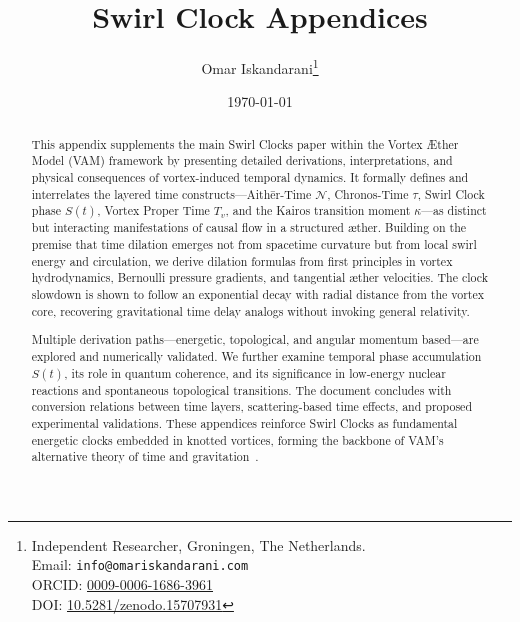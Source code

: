 \documentclass[a4paper,12pt]{article}
\title{Swirl Clock Appendices\\[0.5em]}
\author{
    Omar Iskandarani\thanks{
        Independent Researcher, Groningen, The Netherlands.\\
        Email: \texttt{info@omariskandarani.com}\\
        ORCID: \href{https://orcid.org/0009-0006-1686-3961}{0009-0006-1686-3961}\\
        DOI: \href{https://doi.org/10.5281/zenodo.15707931}{10.5281/zenodo.15707931}
    }
}
\date{\today}
\begin{document}
    \maketitle
    \vspace{-2ex}


\begin{abstract}
This appendix supplements the main Swirl Clocks paper within the Vortex \AE{}ther Model (VAM) framework by presenting detailed derivations, interpretations, and physical consequences of vortex-induced temporal dynamics. It formally defines and interrelates the layered time constructs—Aithēr-Time \( \mathcal{N} \), Chronos-Time \( \tau \), Swirl Clock phase \( S(t) \), Vortex Proper Time \( T_v \), and the Kairos transition moment \( \kappa \)—as distinct but interacting manifestations of causal flow in a structured æther. Building on the premise that time dilation emerges not from spacetime curvature but from local swirl energy and circulation, we derive dilation formulas from first principles in vortex hydrodynamics, Bernoulli pressure gradients, and tangential \ae{}ther velocities. The clock slowdown is shown to follow an exponential decay with radial distance from the vortex core, recovering gravitational time delay analogs without invoking general relativity.

Multiple derivation paths—energetic, topological, and angular momentum based—are explored and numerically validated. We further examine temporal phase accumulation \( S(t) \), its role in quantum coherence, and its significance in low-energy nuclear reactions and spontaneous topological transitions. The document concludes with conversion relations between time layers, scattering-based time effects, and proposed experimental validations. These appendices reinforce Swirl Clocks as fundamental energetic clocks embedded in knotted vortices, forming the backbone of VAM’s alternative theory of time and gravitation~\cite{iskandarani2025vam0, iskandarani2025vam1,iskandarani2025vam2,iskandarani2025VAM3}.
\end{abstract}



    \vfill

\newpage
\tableofcontents
\newpage

%
%
%
%
%
%
%
%
%
%
%
\end{document}
